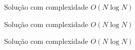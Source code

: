 \begin{frame}[fragile]{Solução com complexidade $O(N\log N)$}
\end{frame}

\begin{frame}[fragile]{Solução com complexidade $O(N\log N)$}
\end{frame}

\begin{frame}[fragile]{Solução com complexidade $O(N\log N)$}
\end{frame}
